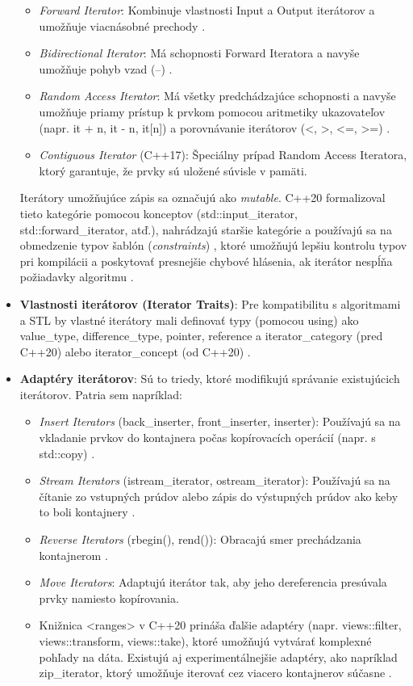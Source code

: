 \documentclass[11pt]{article}
\begin{document}
\begin{itemize}
\begin{itemize}
    \item \textit{Forward Iterator}: Kombinuje vlastnosti Input a Output iterátorov a umožňuje viacnásobné prechody \cite{10162792}.
    \item \textit{Bidirectional Iterator}: Má schopnosti Forward Iteratora a navyše umožňuje pohyb vzad (--) \cite{10162792}.
    \item \textit{Random Access Iterator}: Má všetky predchádzajúce schopnosti a navyše umožňuje priamy prístup k prvkom pomocou aritmetiky ukazovateľov (napr. it + n, it - n, it[n]) a porovnávanie iterátorov (<, >, <=, >=) \cite{10162792}.
    \item \textit{Contiguous Iterator} (C++17): Špeciálny prípad Random Access Iteratora, ktorý garantuje, že prvky sú uložené súvisle v pamäti.
  \end{itemize}

  Iterátory umožňujúce zápis sa označujú ako \textit{mutable}. C++20 formalizoval tieto kategórie pomocou konceptov (std::input\_iterator, std::forward\_iterator, atď.), nahrádzajú staršie kategórie a používajú sa na obmedzenie typov šablón (\textit{constraints}) \cite{10162792}, ktoré umožňujú lepšiu kontrolu typov pri kompilácii a poskytovať presnejšie chybové hlásenia, ak iterátor nespĺňa požiadavky algoritmu \cite{10162792}.

  \item \textbf{Vlastnosti iterátorov (Iterator Traits)}: Pre kompatibilitu s algoritmami a STL by vlastné iterátory mali definovať typy (pomocou using) ako value\_type, difference\_type, pointer, reference a iterator\_category (pred C++20) alebo iterator\_concept (od C++20) \cite{10162792}.
  \item \textbf{Adaptéry iterátorov}: Sú to triedy, ktoré modifikujú správanie existujúcich iterátorov. Patria sem napríklad:
  \begin{itemize}
    \item \textit{Insert Iterators} (back\_inserter, front\_inserter, inserter): Používajú sa na vkladanie prvkov do kontajnera počas kopírovacích operácií (napr. s std::copy) \cite{10162792}.
    \item \textit{Stream Iterators} (istream\_iterator, ostream\_iterator): Používajú sa na čítanie zo vstupných prúdov alebo zápis do výstupných prúdov ako keby to boli kontajnery \cite{10162792}.
    \item \textit{Reverse Iterators} (rbegin(), rend()): Obracajú smer prechádzania kontajnerom \cite{10162792}.
    \item \textit{Move Iterators}: Adaptujú iterátor tak, aby jeho dereferencia presúvala prvky namiesto kopírovania.
    \item Knižnica <ranges> v C++20 prináša ďalšie adaptéry (napr. views::filter, views::transform, views::take), ktoré umožňujú vytvárať komplexné pohľady na dáta. Existujú aj experimentálnejšie adaptéry, ako napríklad zip\_iterator, ktorý umožňuje iterovať cez viacero kontajnerov súčasne \cite{10162792}.
  \end{itemize}
\end{itemize}
\end{document}
